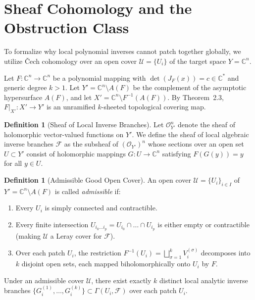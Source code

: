 \documentclass[11pt,reqno]{amsart}
\theoremstyle{definition}
\newtheorem{definition}[theorem]{Definition}
\begin{document}
\section{Sheaf Cohomology and the Obstruction Class}

To formalize why local polynomial inverses cannot patch together globally, we utilize \v{C}ech cohomology over an open cover $\mathcal{U} = \{U_i\}$ of the target space $Y = \mathbb{C}^n$.


Let $F: \mathbb{C}^n \to \mathbb{C}^n$ be a polynomial mapping with $\det(J_F(x)) = c \in \mathbb{C}^*$ and generic degree $k > 1$. Let $Y' = \mathbb{C}^n \setminus A(F)$ be the complement of the asymptotic hypersurface $A(F)$, and let $X' = \mathbb{C}^n \setminus F^{-1}(A(F))$. By Theorem~2.3, $F\big|_{X'}: X' \to Y'$ is an unramified $k$-sheeted topological covering map.

\begin{definition}[Sheaf of Local Inverse Branches]
Let $\mathcal{O}_{Y'}^n$ denote the sheaf of holomorphic vector-valued functions on $Y'$. We define the sheaf of local algebraic inverse branches $\mathcal{F}$ as the subsheaf of $(\mathcal{O}_{Y'})^n$ whose sections over an open set $U \subset Y'$ consist of holomorphic mappings $G: U \to \mathbb{C}^n$ satisfying $F(G(y)) = y$ for all $y \in U$.
\end{definition}

\begin{definition}[Admissible Good Open Cover]
An open cover $\mathcal{U} = \{U_i\}_{i \in I}$ of $Y' = \mathbb{C}^n \setminus A(F)$ is called \emph{admissible} if:
\begin{enumerate}
    \item Every $U_i$ is simply connected and contractible.
    \item Every finite intersection $U_{i_0 \dots i_p} = U_{i_0} \cap \dots \cap U_{i_p}$ is either empty or contractible (making $\mathcal{U}$ a Leray cover for $\mathcal{F}$).
    \item Over each patch $U_i$, the restriction $F^{-1}(U_i) = \bigsqcup_{\sigma=1}^k V_i^{(\sigma)}$ decomposes into $k$ disjoint open sets, each mapped biholomorphically onto $U_i$ by $F$.
\end{enumerate}
Under an admissible cover $\mathcal{U}$, there exist exactly $k$ distinct local analytic inverse branches $\{G_i^{(1)}, \dots, G_i^{(k)}\} \subset \Gamma(U_i, \mathcal{F})$ over each patch $U_i$.
\end{definition}
\end{document}

